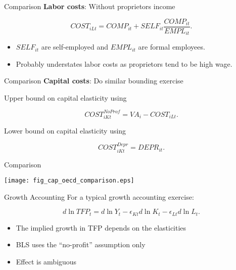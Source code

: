\documentclass[10pt, xcolor=dvipsnames]{beamer}
\begin{document}
\begin{frame}{Comparison}
\textbf{Labor costs}: Without proprietors income

\begin{equation}
  COST_{iLt} = COMP_{it} + SELF_{it}\frac{COMP_{it}}{EMPL_{it}}.
\end{equation}

\begin{itemize}
  \item $SELF_{it}$ are self-employed and $EMPL_{it}$ are formal employees. 
  \item Probably understates labor costs as proprietors tend to be high wage.
\end{itemize}

\end{frame}

\begin{frame}{Comparison}
\textbf{Capital costs}: Do similar bounding exercise

\vspace{.25in}
Upper bound on capital elasticity using

\begin{equation}
  COST_{iKt}^{NoProf} = VA_i - COST_{iLt}.
\end{equation}

\vspace{.25in}
Lower bound on capital elasticity using

\begin{equation}
  COST_{iKt}^{Depr} = DEPR_{it}.
\end{equation}

\end{frame}

\begin{frame}{Comparison}
\begin{center}
\texttt{[image: fig\_cap\_oecd\_comparison.eps]}
\end{center}
\end{frame}

\begin{frame}{Growth Accounting}
For a typical growth accounting exercise:

\begin{equation}
  d \ln TFP_t = d \ln Y_t - \epsilon_{Kt} d \ln K_t - \epsilon_{Lt} d \ln L_t. \label{EQ_accounting}
\end{equation}

\begin{itemize}
  \item The implied growth in TFP depends on the elasticities
  \item BLS uses the ``no-profit'' assumption only
  \item Effect is ambiguous 
\end{itemize}

\end{frame}
\end{document}
